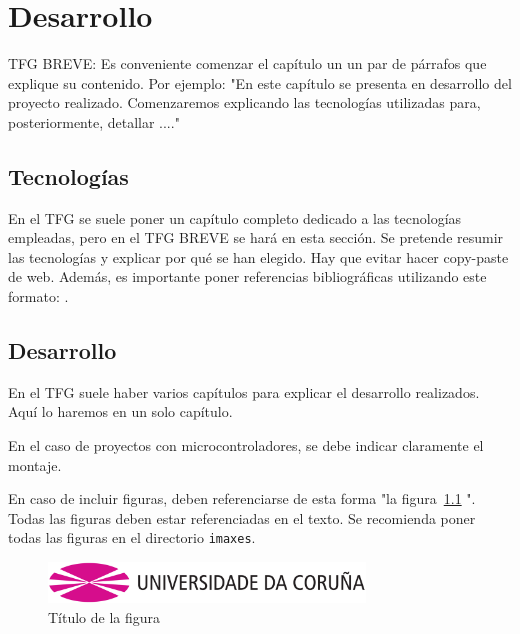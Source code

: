 \chapter{Desarrollo}
\label{cap:desarrollo}

TFG BREVE: Es conveniente comenzar el capítulo un un par de párrafos que explique su contenido. Por ejemplo: "En este capítulo se presenta en desarrollo del proyecto realizado. Comenzaremos explicando las tecnologías utilizadas para, posteriormente, detallar ...."

\section{Tecnologías}
En el TFG se suele poner un capítulo completo dedicado a las tecnologías empleadas, pero en el TFG BREVE se hará en esta sección. Se pretende resumir las tecnologías y explicar por qué se han elegido. Hay que evitar hacer copy-paste de web. Además, es importante poner referencias bibliográficas utilizando este formato: \cite{ErlangBook,ErlangWebBook}. 

\section{Desarrollo}
En el TFG suele haber varios capítulos para explicar el desarrollo realizados. Aquí lo haremos en un solo capítulo.

En el caso de proyectos con microcontroladores, se debe indicar claramente el montaje. 

En caso de incluir figuras, deben referenciarse de esta forma "la figura~\ref{fig:exemplo} ". Todas las figuras deben estar referenciadas en el texto.
Se recomienda poner todas las figuras en el directorio \texttt{imaxes}.

\begin{figure}[hp!]
  \centering
  \includegraphics[width=0.75\textwidth]{imaxes/udc.png}
  \caption{Título de la figura}
  \label{fig:exemplo}
\end{figure}

